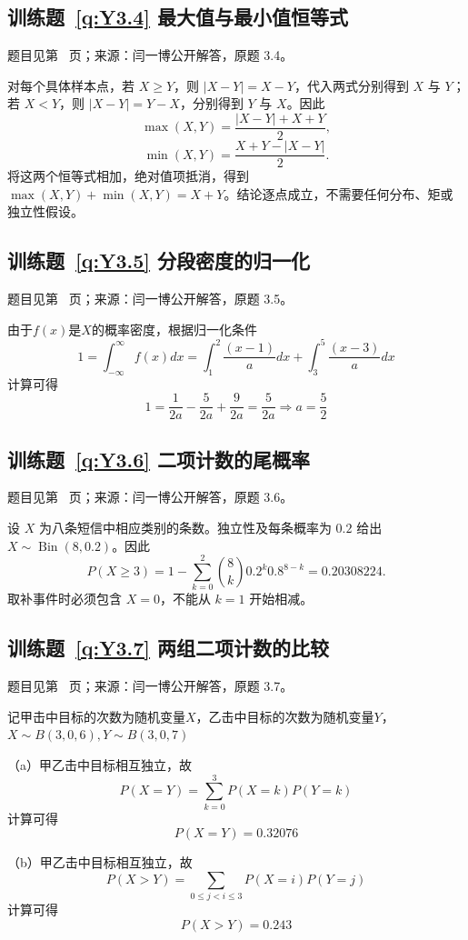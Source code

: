 \documentclass[UTF8,12pt,a4paper,fontset=fandol]{ctexbook}
\begin{document}
\subsection*{训练题~\ref{q:Y3.4} 最大值与最小值恒等式}\label{a:Y3.4}{\small 题目见第~\pageref{q:Y3.4} 页；来源：闫一博公开解答，原题 3.4。}
\begin{solve}对每个具体样本点，若 $X\ge Y$，则 $|X-Y|=X-Y$，代入两式分别得到 $X$ 与 $Y$；若 $X<Y$，则 $|X-Y|=Y-X$，分别得到 $Y$ 与 $X$。因此\[\max(X,Y)=\frac{|X-Y|+X+Y}{2},\]\[\min(X,Y)=\frac{X+Y-|X-Y|}{2}.\]将这两个恒等式相加，绝对值项抵消，得到 $\max(X,Y)+\min(X,Y)=X+Y$。结论逐点成立，不需要任何分布、矩或独立性假设。\end{solve}

\subsection*{训练题~\ref{q:Y3.5} 分段密度的归一化}\label{a:Y3.5}{\small 题目见第~\pageref{q:Y3.5} 页；来源：闫一博公开解答，原题 3.5。}
\begin{solve}
由于$f(x)$是$X$的概率密度，根据归一化条件
\[1 = \int_{ - \infty }^\infty  {f(x)dx}  = \int_1^2 {\frac{{(x - 1)}}{a}dx}  + \int_3^5 {\frac{{(x - 3)}}{a}dx} \]
计算可得
\[1 = \frac{1}{{2a}} - \frac{5}{{2a}} + \frac{9}{{2a}} = \frac{5}{{2a}} \Rightarrow a = \frac{5}{2}\]
\end{solve}

\subsection*{训练题~\ref{q:Y3.6} 二项计数的尾概率}\label{a:Y3.6}{\small 题目见第~\pageref{q:Y3.6} 页；来源：闫一博公开解答，原题 3.6。}
\begin{solve}设 $X$ 为八条短信中相应类别的条数。独立性及每条概率为 $0.2$ 给出 $X\sim\operatorname{Bin}(8,0.2)$。因此\[P(X\ge3)=1-\sum_{k=0}^{2}\binom8k0.2^k0.8^{8-k}=0.20308224.\]取补事件时必须包含 $X=0$，不能从 $k=1$ 开始相减。\end{solve}

\subsection*{训练题~\ref{q:Y3.7} 两组二项计数的比较}\label{a:Y3.7}{\small 题目见第~\pageref{q:Y3.7} 页；来源：闫一博公开解答，原题 3.7。}
\begin{solve}
记甲击中目标的次数为随机变量$X$，乙击中目标的次数为随机变量$Y$，$X\sim B(3,0,6),Y\sim B(3,0,7)$

（a）甲乙击中目标相互独立，故
\[P(X = Y) = \sum\limits_{k = 0}^3 {P(X = k)P(Y = k)} \]
计算可得
\[P(X = Y) = 0.32076\]

（b）甲乙击中目标相互独立，故
\[P(X > Y) = \sum\limits_{0 \leqslant j < i \leqslant 3} {P(X = i)P(Y = j)} \]
计算可得
\[P(X > Y) = 0.243\]
\end{solve}
\end{document}
